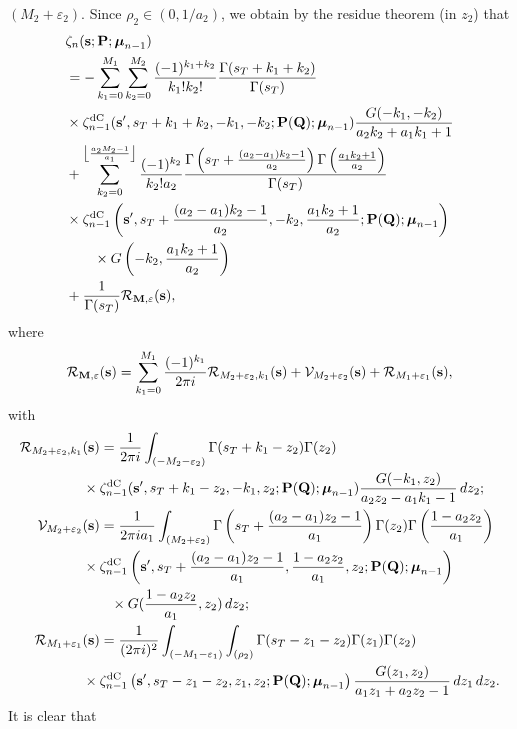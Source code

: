 \documentclass[a4paper,12pt]{article}
\theoremstyle{definition}
\numberwithin{equation}{section}
\def\s{{\bf s}}
\def\P{{\bf P}}
\def\M{{\bf M}}
\newcommand{\mub}{\boldsymbol{\mu}}
\newcommand{\dc}{\mathrm{dC}}
\newcommand{\dd}{d}
\newcommand{\ii}{i}
\def\eps{{\varepsilon}}
\begin{document}
$(M_2+\eps_2)$.   Since $\rho_2 \in (0, 1/a_2)$, we obtain by the residue theorem (in $z_2$) that  
\begin{align}\label{keyformula1}
&\zeta_n(\s;\P;\mub_{n-1})\notag\\
&=-\sum_{k_1=0}^{M_1}\sum_{k_2=0}^{M_2}\frac{(-1)^{k_1+k_2}}{k_1! k_2!}
\frac{\Gamma (s_T+k_1+k_2)}{\Gamma (s_T)} \notag \\
& \times \zeta_{n-1}^{\dc}(\s', s_T+k_1+k_2, -k_1, -k_2; \mathbf{P(Q)};\boldsymbol{\mu}_{n-1}) \frac{G(-k_1, -k_2)}{a_2k_2+a_1k_1+1}\notag\\
&  + \sum_{k_2=0}^{\left\lfloor\frac{a_2 M_2-1}{a_1}\right\rfloor}\frac{(-1)^{k_2}}{k_2! a_2}
\frac{\Gamma \left(s_T+\frac{(a_2-a_1)k_2-1}{a_2}\right) \Gamma\left(\frac{a_1 k_2+1}{a_2}\right)}{\Gamma (s_T)} \notag 
\\
& \times\zeta_{n-1}^{\dc}\left(\s', s_T+\frac{(a_2-a_1)k_2-1}{a_2}, - k_2, \frac{a_1k_2+1}{a_2}; \mathbf{P(Q)};\boldsymbol{\mu}_{n-1}\right)\notag\\
&\qquad\times G\left(- k_2, \frac{a_1 k_2+1}{a_2}\right)\notag\\
& +\frac{1}{\Gamma (s_T)} \mathcal R _{\M, {\mathbf{\eps}}} (\s), 
\end{align}
where
$$
\mathcal R _{\M, {\mathbf{\eps}}} (\s)= \sum_{k_1=0}^{M_1}\frac{(-1)^{k_1}}{2\pi \ii } \mathcal R_{M_2+\eps_2, k_1}(\s)+ \mathcal V_{M_2+\eps_2}(\s) + \mathcal R_{M_1+\eps_1}(\s),$$
with  
\begin{align*}
\mathcal{R}_{M_2+\eps_2, k_1}&(\s) = \frac{1}{2\pi \ii} \int_{(-M_2-\eps_2)}\Gamma (s_T+k_1- z_2) \Gamma (z_2) \\
& \times\zeta_{n-1}^{\dc}(\s', s_T+k_1-z_2, -k_1, z_2; \mathbf{P(Q)};\boldsymbol{\mu}_{n-1}) \frac{G(-k_1, z_2)}{a_2z_2-a_1 k_1-1}\, \dd z_2;\\
\mathcal{V}_{M_2+\eps_2}&(\s)= \frac{1}{2\pi \ii a_1} \int_{(M_2+\eps_2)}\Gamma \left(s_T+ \frac{(a_2-a_1)z_2-1}{a_1}\right) \Gamma (z_2)  \Gamma\left(\frac{1-a_2z_2}{a_1}\right)\\
 & \times\zeta_{n-1}^{\dc}\left(\s', s_T+ \frac{(a_2-a_1)z_2-1}{a_1}, \frac{1-a_2z_2}{a_1}, z_2; \mathbf{P(Q)};\boldsymbol{\mu}_{n-1}\right)\\
 &\qquad\times G(\frac{1-a_2z_2}{a_1}, z_2)\, \dd z_2;\\
\mathcal{R}_{M_1+\eps_1}&(\s) =  \frac{1}{(2\pi \ii)^2} \int_{(-M_1-\eps_1)}\int_{(\rho_2)}\Gamma (s_T-z_1-z_2) \Gamma (z_1) \Gamma (z_2) \\
& \times \zeta_{n-1}^{\dc}\left(\s', s_T-z_1-z_2, z_1, z_2; \mathbf{P(Q)};\boldsymbol{\mu}_{n-1}\right) \frac{G(z_1, z_2)}{a_1z_1+a_2z_2-1} \, \dd z_1 \, \dd z_2.
\end{align*}
It is clear that 
\end{document}
